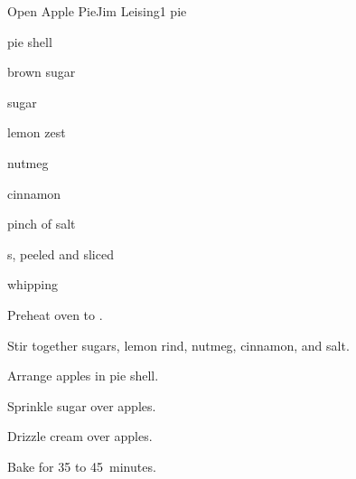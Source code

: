 \begin{recipe}{Open Apple Pie}{Jim Leising}{1 pie}

\begin{ingredients}
\item pie shell
\item \C{\half} brown sugar
\item \C{\half} sugar
\item {} lemon zest
\item \tp{\half} nutmeg
\item \tp{\half} cinnamon
\item pinch of salt
\item {} s, peeled and sliced
\item \C{\third} whipping 
\end{ingredients}

\begin{directions}
\item Preheat oven to .
\item Stir together sugars, lemon rind, nutmeg, cinnamon, and salt.
\item Arrange apples in pie shell.
\item Sprinkle sugar over apples.
\item Drizzle cream over apples.
\item Bake for 35 to 45~minutes.
\end{directions}

\end{recipe}
